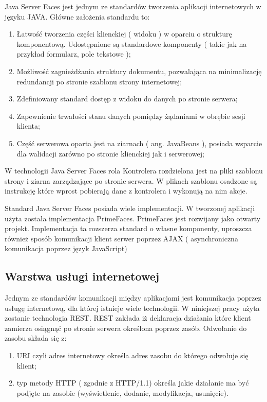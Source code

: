 Java Server Faces jest jednym ze standardów tworzenia aplikacji internetowych w języku JAVA\cite{jsfRef}. Główne założenia standardu to:
\begin{enumerate}
  \item Łatwość tworzenia części klienckiej ( widoku ) w oparciu o strukturę komponentową. Udostępnione są standardowe komponenty ( takie jak na przykład formularz, pole tekstowe );
  \item Możliwość zagnieżdżania struktury dokumentu, pozwalająca na minimalizację redundancji po stronie szablonu strony internetowej; 
  \item Zdefiniowany standard dostęp z widoku do danych po stronie serwera;
  \item Zapewnienie trwałości stanu danych pomiędzy żądaniami w obrębie sesji klienta;
  \item Część serwerowa oparta jest na ziarnach ( ang. JavaBeans ), posiada wsparcie dla walidacji zarówno po stronie klienckiej jak i serwerowej;
\end{enumerate}

W technologii Java Server Faces rola Kontrolera rozdzielona jest na pliki szablonu strony i ziarna zarządzające po stronie serwera. W plikach szablonu osadzone są instrukcję które wprost pobierają dane z kontrolera i wykonują na nim akcje.

Standard Java Server Faces posiada wiele implementacji. W tworzonej aplikacji użyta została implementacja PrimeFaces\cite{primeFaces}. PrimeFaces jest rozwijany jako otwarty projekt. Implementacja ta rozszerza standard o własne komponenty, uproszcza również sposób komunikacji klient serwer poprzez AJAX ( asynchroniczna komunikacja poprzez język JavaScript)

\subsection{Warstwa usługi internetowej}



Jednym ze standardów komunikacji między aplikacjami jest komunikacja poprzez usługę internetową, dla której istnieje wiele technologii. W niniejszej pracy użyta zostanie technologia REST. REST zakłada iż deklaracja działania które klient zamierza osiągnąć po stronie serwera określona poprzez zasób. Odwołanie do zasobu składa się z:
\begin{enumerate}
  \item URI czyli adres internetowy określa adres zasobu do którego odwołuje się klient;
  \item  typ metody HTTP ( zgodnie z HTTP/1.1) określa jakie działanie ma być podjęte na zasobie (wyświetlenie, dodanie, modyfikacja, usunięcie).
\end{enumerate}


